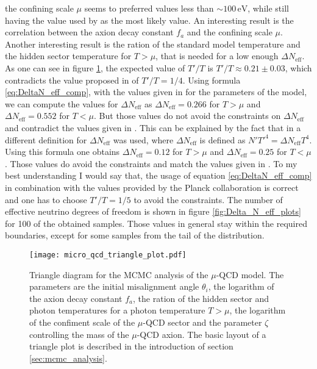 \documentclass[twoside,a4paper, 12pt]{article}
\numberwithin{equation}{section}
\begin{document}
the confining scale $\mu$ seems to preferred values less than $\sim 100 \, \mathrm{eV}$, while still having
the value used by \cite{microqcd} as the most likely value.
An interesting result is the correlation between the axion decay constant $f_a$ and the confining scale $\mu$.
Another interesting result is the ration of the standard model temperature and the hidden sector temperature for $T > \mu$,
that is needed for a low enough $\Delta N_\mathrm{eff}$.
As one can see in figure \ref{fig:micro_qcd_triangle_plot}, the expected value of $T' / T$ is $T' / T \approx 0.21 \pm 0.03$, 
which contradicts the value proposed in \cite{microqcd} of $T' / T = 1 / 4$.
Using formula \eqref{eq:DeltaN_eff_comp}, with the values given in \cite{microqcd} for the parameters of the model,
we can compute the values for $\Delta N_\mathrm{eff}$ as  $\Delta N_\mathrm{eff} = 0.266$ for $T > \mu$
and $\Delta N_\mathrm{eff} = 0.552$ for $T < \mu$.
But those values do not avoid the constraints on $\Delta N_\mathrm{eff}$ and contradict the values given in \cite{microqcd}.
This can be explained by the fact that in \cite{microqcd} a different definition for $\Delta N_\mathrm{eff}$ was used,
where $\Delta N_\mathrm{eff}$ is defined as $N' T'^4 = \Delta N_\mathrm{eff} T^4$.
Using this formula one obtains $\Delta N_\mathrm{eff} = 0.12$ for $T > \mu$ and $\Delta N_\mathrm{eff} = 0.25$ for $T < \mu$.
Those values do avoid the constraints and match the values given in \cite{microqcd}.
To my best understanding I would say that, the usage of equation \eqref{eq:DeltaN_eff_comp} in combination with the
values provided by the Planck collaboration \cite{Planck} is correct and one has to choose $T' / T = 1 / 5$ to avoid the
constraints. %
The number of effective neutrino degrees of freedom is shown in figure \ref{fig:Delta_N_eff_plots}
for 100 of the obtained samples.
Those values in general stay within the required boundaries, except for some samples from the tail of the distribution.
\begin{figure}[H]
    \centering
    \texttt{[image: micro\_qcd\_triangle\_plot.pdf]}
    \caption{Triangle diagram for the MCMC analysis of the $\mu$-QCD model.
    The parameters are the initial misalignment angle $\theta_i$, the logarithm of the 
    axion decay constant $f_a$, the ration of the hidden sector and photon temperatures
    for a photon temperature $T > \mu$, the logarithm of the confiment scale
    of the $\mu$-QCD sector and the parameter $\zeta$ controlling the mass 
    of the $\mu$-QCD axion.
    The basic layout of a triangle plot is described in the introduction of section \ref{sec:mcmc_analysis}.
    }
    \label{fig:micro_qcd_triangle_plot}
\end{figure}
\end{document}
